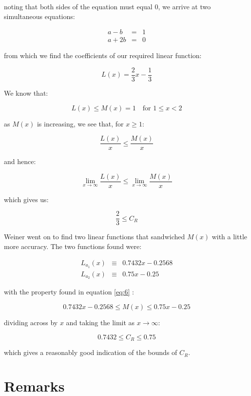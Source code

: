 noting that both sides of the equation must equal $0$, we arrive at two simultaneous equations: \bigskip

\begin{eqnarray*}
	 a - b & = & 1 \\
	a + 2b & = & 0
\end{eqnarray*}\medskip

from which we find the coefficients of our required linear function: \bigskip

\[
	L(x) = \frac{2}{3}x - \frac{1}{3}
\]\medskip

We know that: \bigskip

\[
	L(x) \leq M(x) = 1 \quad \text{for } 1 \leq x < 2
\]\medskip

as $M(x)$ is increasing, we see that, for $x \geq 1$: \bigskip

\[
	\frac{L(x)}{x} \leq \frac{M(x)}{x} 
\]\medskip

and hence: \bigskip

\[
	\lim_{x \to \infty} \frac{L(x)}{x} \leq \lim_{x \to \infty} \frac{M(x)}{x} 
\]\medskip

which gives us: \bigskip

\[
	\frac{2}{3} \leq C_R
\]\medskip

Weiner went on to find two linear functions that sandwiched $M(x)$ with a little more accuracy. The two 
functions found were: \bigskip

\begin{eqnarray*}
	L_{a_1}(x) & \equiv & 0.7432x - 0.2568 \\
	L_{a_2}(x) & \equiv & 0.75x - 0.25
\end{eqnarray*}\medskip

with the property found in equation \ref{eq:6} : \bigskip

\[
	0.7432x - 0.2568 \leq M(x) \leq 0.75x - 0.25 
\]\medskip

dividing across by $x$ and taking the limit as $x \to \infty$: \bigskip

\[
	0.7432 \leq C_R \leq 0.75 
\]\medskip

which gives a reasonably good indication of the bounds of $C_R$. \bigskip













\section{Remarks}

